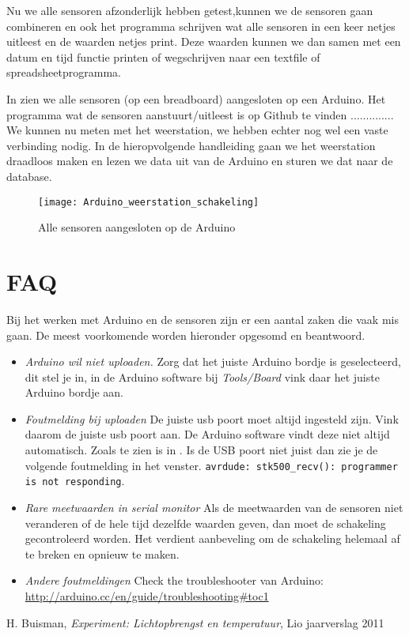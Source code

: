 Nu we alle sensoren afzonderlijk hebben getest,kunnen we de sensoren
gaan combineren en ook het programma schrijven wat alle sensoren in een
keer netjes uitleest en de waarden netjes print. Deze waarden kunnen we
dan samen met een datum en tijd functie printen of wegschrijven naar een
textfile of spreadsheetprogramma.

In  zien we alle sensoren (op
een breadboard) aangesloten op een Arduino. Het programma wat de
sensoren aanstuurt/uitleest is op Github te vinden .............. We
kunnen nu meten met het weerstation, we hebben echter nog wel een vaste
verbinding nodig. In de hieropvolgende handleiding gaan we het
weerstation draadloos maken en lezen we data uit van de Arduino en
sturen we dat naar de \hisparc database.




\begin{figure}
    \centering
    \texttt{[image: Arduino\_weerstation\_schakeling]}
    \caption{Alle sensoren aangesloten op de Arduino}
   \label{fig:Arduino_weerstation_schakeling}
\end{figure}


\section{FAQ}

Bij het werken met Arduino en de sensoren zijn er een aantal zaken die vaak mis
gaan. De meest voorkomende worden hieronder opgesomd en beantwoord.

\begin{itemize} 
    \item \emph{Arduino wil niet uploaden.} Zorg dat het
    juiste Arduino bordje is geselecteerd, dit stel je in, in de Arduino
    software bij \emph{Tools/Board} vink daar het juiste Arduino bordje aan.
    \item \emph{Foutmelding bij uploaden} De juiste usb poort moet altijd
    ingesteld zijn. Vink daarom de juiste usb poort aan. De Arduino software
    vindt deze niet altijd automatisch. Zoals te zien is in
    . Is de USB poort niet juist dan zie je de
    volgende foutmelding in het venster.
    \verb|avrdude: stk500_recv(): programmer is not responding|.
    \item \emph{Rare meetwaarden in serial
    monitor} Als de meetwaarden van de sensoren niet veranderen of de hele
    tijd dezelfde waarden geven, dan moet de schakeling gecontroleerd
    worden. Het verdient aanbeveling om de schakeling helemaal af te breken
    en opnieuw te maken.
    \item \emph{Andere foutmeldingen} Check the troubleshooter van Arduino: 
    \url{http://arduino.cc/en/guide/troubleshooting#toc1} 
    
\end{itemize}

\begin{thebibliography}{9}
        H. Buisman, \emph{\hisparc Experiment: Lichtopbrengst en temperatuur}, 
        Lio jaarverslag 2011
\end{thebibliography}



